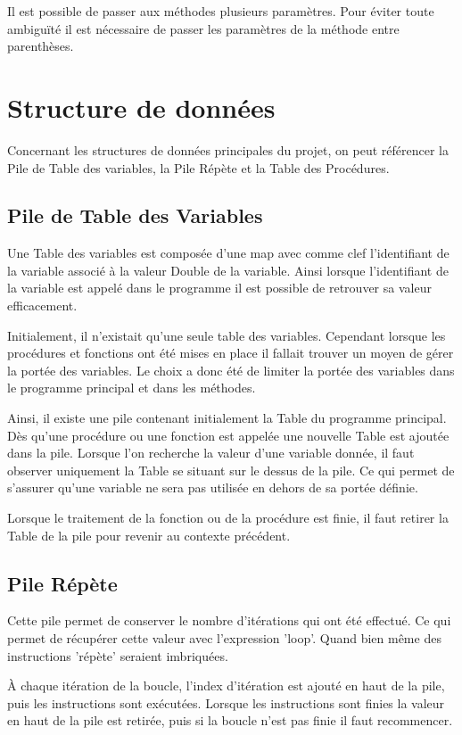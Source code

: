 \documentclass[a4paper,11pt]{article}
\begin{document}
Il est possible de passer aux méthodes plusieurs paramètres. Pour éviter toute ambiguïté il est nécessaire de passer les paramètres de la méthode entre parenthèses.  




\section{Structure de données}
Concernant les structures de données principales du projet, on peut référencer la Pile de Table des variables, la Pile Répète et la Table des Procédures.

\subsection{Pile de Table des Variables}
Une Table des variables est composée d'une map avec comme clef l'identifiant de la variable associé à la valeur Double de la variable. Ainsi lorsque l'identifiant de la variable est appelé dans le programme il est possible de retrouver sa valeur efficacement.

Initialement, il n'existait qu'une seule table des variables. Cependant lorsque les procédures et fonctions ont été mises en place il fallait trouver un moyen de gérer la portée des variables.
Le choix a donc été de limiter la portée des variables dans le programme principal et dans les méthodes. 

Ainsi, il existe une pile contenant initialement la Table du programme principal. Dès qu'une procédure ou une fonction est appelée une nouvelle Table est ajoutée dans la pile.
Lorsque l'on recherche la valeur d'une variable donnée, il faut observer uniquement la Table se situant sur le dessus de la pile. Ce qui permet de s'assurer qu'une variable ne sera pas utilisée en dehors de sa portée définie.

Lorsque le traitement de la fonction ou de la procédure est finie, il faut retirer la Table de la pile pour revenir au contexte précédent.


\subsection{Pile Répète}
Cette pile permet de conserver le nombre d'itérations qui ont été effectué. Ce qui permet de récupérer cette valeur avec l'expression 'loop'. Quand bien même des instructions 'répète' seraient imbriquées.

À chaque itération de la boucle, l'index d'itération est ajouté en haut de la pile, puis les instructions sont exécutées. Lorsque les instructions sont finies la valeur en haut de la pile est retirée, puis si la boucle n'est pas finie il faut recommencer. 
\end{document}

